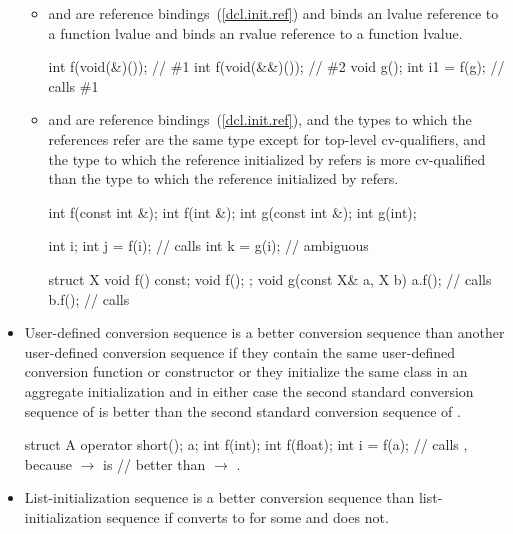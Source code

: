\begin{itemize}
\begin{itemize}
\item
{} and  are reference bindings~(\ref{dcl.init.ref}) and
 binds an lvalue reference to a function lvalue and  binds
an rvalue reference to a function lvalue. \enterexample
\begin{codeblock}
int f(void(&)());               // \#1
int f(void(&&)());              // \#2
void g();
int i1 = f(g);                  // calls \#1
\end{codeblock}
\exitexample

\item
{}
and
are reference bindings~(\ref{dcl.init.ref}), and the types to which the references
refer are the same type except for top-level cv-qualifiers, and the type to
which the reference initialized by
refers is more cv-qualified than the type to which the reference initialized by
refers.
\enterexample

\begin{codeblock}
int f(const int &);
int f(int &);
int g(const int &);
int g(int);

int i;
int j = f(i);                   // calls 
int k = g(i);                   // ambiguous

struct X {
  void f() const;
  void f();
};
void g(const X& a, X b) {
  a.f();                        // calls 
  b.f();                        // calls 
}
\end{codeblock}
\exitexample
\end{itemize}

\item
User-defined conversion sequence
is a better conversion sequence than another user-defined conversion
sequence
if they contain the same user-defined conversion function or
constructor or they initialize the same class in an aggregate
initialization and in either case the second standard conversion
sequence of
is better than
the second standard conversion sequence of
.
\enterexample

\begin{codeblock}
struct A {
  operator short();
} a;
int f(int);
int f(float);
int i = f(a);                   // calls , because  $\to$  is
                                // better than  $\to$ .
\end{codeblock}
\exitexample

\item
List-initialization sequence  is a better conversion sequence than
list-initialization sequence  if  converts to
 for some  and  does not.

\end{itemize}

